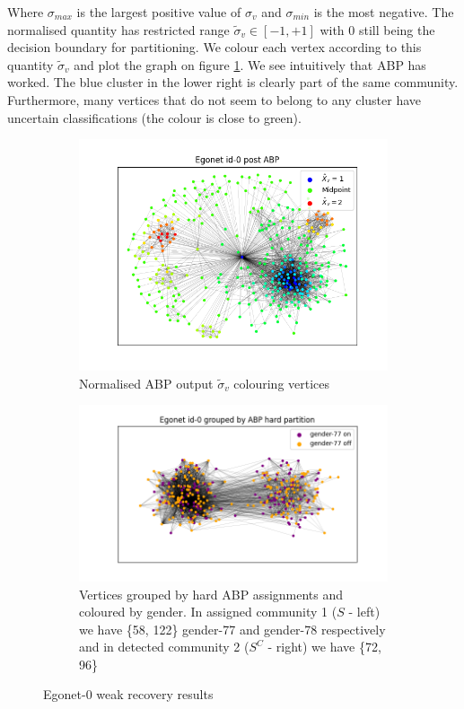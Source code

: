 \documentclass[]{article}
\newcommand{\figwidth}{\linewidth}
\begin{document}
\begin{multicols*}{2}
Where $\sigma_{max}$ is the largest positive value of $\sigma_v$ and $\sigma_{min}$ is the most negative. The normalised quantity has restricted range $\tilde{\sigma}_v \in [-1, +1]$ with $0$ still being the decision boundary for partitioning. We colour each vertex according to this quantity $\tilde{\sigma}_v$ and plot the graph on figure \ref{fig:abp-output-norm}. We see intuitively that ABP has worked. The blue cluster in the lower right is clearly part of the same community. Furthermore, many vertices that do not seem to belong to any cluster have uncertain classifications (the colour is close to green).
%
\begin{figure}[H]
	\centering
	\begin{subfigure}{\figwidth}
		\includegraphics[width=\linewidth]{ego-0-abp.png}
		\caption{Normalised ABP output $\tilde{\sigma}_v$ colouring vertices}
		\label{fig:abp-output-norm}
	\end{subfigure}
	\begin{subfigure}{\figwidth}
		\includegraphics[width=\linewidth]{ego-0-abp-by-gender.png}
		\caption{Vertices grouped by hard ABP assignments and coloured by gender. In assigned community 1 ($S$ - left) we have \{58, 122\} gender-77 and gender-78 respectively and in detected community 2 ($S^C$ - right) we have \{72, 96\}}
		\label{fig:abp-output-by-gender}
	\end{subfigure}
	\caption{Egonet-0 weak recovery results}
\end{figure}


\end{multicols*}
\end{document}
